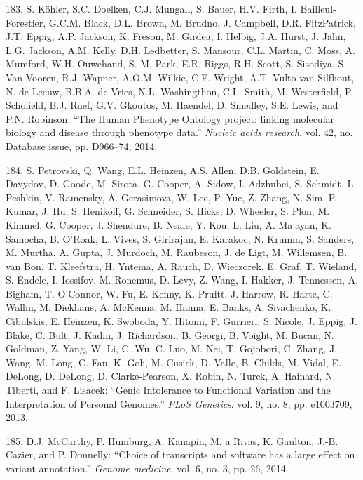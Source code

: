 \documentclass[12pt,a4paper,twoside]{ugathesis}
\theoremstyle{definition}
\theoremstyle{definition}
\theoremstyle{definition}
\theoremstyle{remark}
\begin{document}
\hypertarget{ref-Kohler2014}{}
183. S. Köhler, S.C. Doelken, C.J. Mungall, S. Bauer, H.V. Firth, I.
Bailleul-Forestier, G.C.M. Black, D.L. Brown, M. Brudno, J. Campbell,
D.R. FitzPatrick, J.T. Eppig, A.P. Jackson, K. Freson, M. Girdea, I.
Helbig, J.A. Hurst, J. Jähn, L.G. Jackson, A.M. Kelly, D.H. Ledbetter,
S. Mansour, C.L. Martin, C. Moss, A. Mumford, W.H. Ouwehand, S.-M. Park,
E.R. Riggs, R.H. Scott, S. Sisodiya, S. Van Vooren, R.J. Wapner, A.O.M.
Wilkie, C.F. Wright, A.T. Vulto-van Silfhout, N. de Leeuw, B.B.A. de
Vries, N.L. Washingthon, C.L. Smith, M. Westerfield, P. Schofield, B.J.
Ruef, G.V. Gkoutos, M. Haendel, D. Smedley, S.E. Lewis, and P.N.
Robinson: ``The Human Phenotype Ontology project: linking molecular
biology and disease through phenotype data.'' \emph{Nucleic acids
research}. vol. 42, no. Database issue, pp. D966--74, 2014.

\hypertarget{ref-Petrovski2013}{}
184. S. Petrovski, Q. Wang, E.L. Heinzen, A.S. Allen, D.B. Goldstein, E.
Davydov, D. Goode, M. Sirota, G. Cooper, A. Sidow, I. Adzhubei, S.
Schmidt, L. Peshkin, V. Ramensky, A. Gerasimova, W. Lee, P. Yue, Z.
Zhang, N. Sim, P. Kumar, J. Hu, S. Henikoff, G. Schneider, S. Hicks, D.
Wheeler, S. Plon, M. Kimmel, G. Cooper, J. Shendure, B. Neale, Y. Kou,
L. Liu, A. Ma'ayan, K. Samocha, B. O'Roak, L. Vives, S. Girirajan, E.
Karakoc, N. Krumm, S. Sanders, M. Murtha, A. Gupta, J. Murdoch, M.
Raubeson, J. de Ligt, M. Willemsen, B. van Bon, T. Kleefstra, H. Yntema,
A. Rauch, D. Wieczorek, E. Graf, T. Wieland, S. Endele, I. Iossifov, M.
Ronemus, D. Levy, Z. Wang, I. Hakker, J. Tennessen, A. Bigham, T.
O'Connor, W. Fu, E. Kenny, K. Pruitt, J. Harrow, R. Harte, C. Wallin, M.
Diekhans, A. McKenna, M. Hanna, E. Banks, A. Sivachenko, K. Cibulskis,
E. Heinzen, K. Swoboda, Y. Hitomi, F. Gurrieri, S. Nicole, J. Eppig, J.
Blake, C. Bult, J. Kadin, J. Richardson, B. Georgi, B. Voight, M. Bucan,
N. Goldman, Z. Yang, W. Li, C. Wu, C. Luo, M. Nei, T. Gojobori, C.
Zhang, J. Wang, M. Long, C. Fan, K. Goh, M. Cusick, D. Valle, B. Childs,
M. Vidal, E. DeLong, D. DeLong, D. Clarke-Pearson, X. Robin, N. Turck,
A. Hainard, N. Tiberti, and F. Lisacek: ``Genic Intolerance to
Functional Variation and the Interpretation of Personal Genomes.''
\emph{PLoS Genetics}. vol. 9, no. 8, pp. e1003709, 2013.

\hypertarget{ref-McCarthy2014}{}
185. D.J. McCarthy, P. Humburg, A. Kanapin, M. a Rivas, K. Gaulton,
J.-B. Cazier, and P. Donnelly: ``Choice of transcripts and software has
a large effect on variant annotation.'' \emph{Genome medicine}. vol. 6,
no. 3, pp. 26, 2014.
\end{document}
